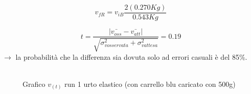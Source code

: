 \documentclass[a4paper]{article}
\theoremstyle{definition}
\begin{document}
\[v_{f R} = v_{i B} \frac{2 (0.270 Kg)}{0.543 Kg}\]

\[t = \frac{ \left |\bar{v_{oss}}  - \bar{v_{att}} \right |}{\sqrt{\sigma_{vosservata}^{2}+ \sigma_{vattesa}^{2}}} = 0.19\]
\noindent \(\rightarrow\) la probabilità che la differenza sia dovuta solo ad errori casuali è del 85\(\%\).\\\\

\begin{figure}[!ht]
	\captionsetup{labelformat=empty}
	\caption{Grafico \(v_{(t)}\) run 1 urto elastico (con carrello blu caricato con 500g)}
	
\end{figure}
\end{document}
